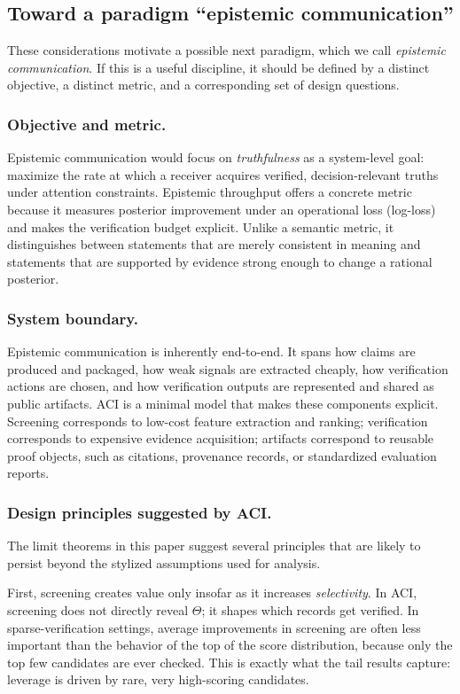 \documentclass[twocolumn]{scholar7}
\begin{document}
\subsection{Toward a paradigm ``epistemic communication''}
These considerations motivate a possible next paradigm, which we call \emph{epistemic communication}. If this is a useful discipline, it should be defined by a distinct objective, a distinct metric, and a corresponding set of design questions.

\subsubsection{Objective and metric.}
Epistemic communication would focus on \emph{truthfulness} as a system-level goal: maximize the rate at which a receiver acquires verified, decision-relevant truths under attention constraints. Epistemic throughput offers a concrete metric because it measures posterior improvement under an operational loss (log-loss) and makes the verification budget explicit. Unlike a semantic metric, it distinguishes between statements that are merely consistent in meaning and statements that are supported by evidence strong enough to change a rational posterior.

\subsubsection{System boundary.}
Epistemic communication is inherently end-to-end. It spans how claims are produced and packaged, how weak signals are extracted cheaply, how verification actions are chosen, and how verification outputs are represented and shared as public artifacts. ACI is a minimal model that makes these components explicit. Screening corresponds to low-cost feature extraction and ranking; verification corresponds to expensive evidence acquisition; artifacts correspond to reusable proof objects, such as citations, provenance records, or standardized evaluation reports.

\subsubsection{Design principles suggested by ACI.}
The limit theorems in this paper suggest several principles that are likely to persist beyond the stylized assumptions used for analysis.

First, screening creates value only insofar as it increases \emph{selectivity}. In ACI, screening does not directly reveal \(\Theta\); it shapes which records get verified. In sparse-verification settings, average improvements in screening are often less important than the behavior of the top of the score distribution, because only the top few candidates are ever checked. This is exactly what the tail results capture: leverage is driven by rare, very high-scoring candidates.
\end{document}

